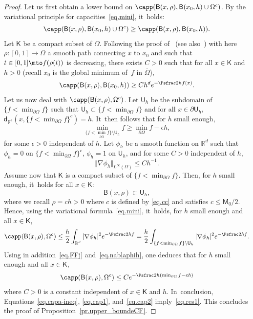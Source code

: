 \begin{proof}
Let us first obtain a lower bound on $\capp(\mathsf B(x,\rho), \mathsf B(x_0,h) \cup \Omega^c)$.
By the variational principle for capacities~\eqref{eq.mini}, it~holds:
\[
\capp(\mathsf B(x,\rho), \mathsf B(x_0,h) \cup \Omega^c)\ge \capp(\mathsf B(x,\rho), \mathsf B(x_0,h)).
\]
Let $\mathsf K$ be a compact subset of $\Omega$.
Following the proof of~\cite[Lem.\,7.10]{landim2017dirichlet} (see also~\cite[Prop.\,4.7]{BEGK}) with here $\rho:[0,1]\to \Omega$ a smooth path connecting $x$ to $x_0$ and such that $t\in [0,1]\mto f(\rho(t))$ is decreasing, there exists $C>0$ such that for all $x\in \mathsf K$ and $h>0$ (recall $x_0$ is the global minimum of~$f$ in $\overline{\Omega}$),
\begin{equation}\label{eq.cap1}
\capp(\mathsf B(x,\rho), \mathsf B(x_0,h))\ge C h^d e^{-\Psfrac 2h f(x)}.
\end{equation}
Let us now deal with $\capp(\mathsf B(x,\rho), \Omega^c) $.
Let
$\mathsf U_h$ be the subdomain of $\{f<\min_{\partial \Omega}f\}$ such that $\overline{\mathsf U_h }\subset \{f<\min_{\partial \Omega}f\} $ and for all $x\in \partial \mathsf U_h$,
$\mathsf d_{\mathbb R^d}(x, {\{f<\min_{\partial \Omega}f\} }^c)=h$. It~then follows that for $h$ small enough,
\begin{equation}\label{eq.FFj}
\min_{\{f<\min_{\partial \Omega}f\} \setminus {\mathsf U_h }} f\ge \min_{\partial \Omega}f -\epsilon h,
\end{equation}
for some $\epsilon >0$ independent of $h$. Let $\phi_h$ be a smooth function on $\mathbb R^d$ such that $\phi_h=0$ on $\{f<\min_{\partial \Omega}f\}^c$, $\phi_h=1$ on $ \mathsf U_h $, and for some $C>0$ independent of $h$,
\begin{equation}\label{eq.nablaphih}
\Vert \nabla \phi_h\Vert _{L^\infty(\Omega)}\le Ch^{-1}.
\end{equation}
Assume now that $\mathsf K$ is a compact subset of $\{f<\min_{\partial \Omega}f\}$. Then, for $h$ small enough, it~holds for all $x\in \mathsf K$:
\[
{\mathsf B(x,\rho)}\subset \mathsf U_h,
\]
where we recall $\rho=ch>0$ where $c$ is defined by \eqref{eq.cc} and satisfies $c\le \mathsf M_0/2$.
Hence, using the variational formula~\eqref{eq.mini}, it~holds, for $h$ small enough and all $x\in \mathsf K$,
\[
\capp(\mathsf B(x,\rho), \Omega^c) \le \frac h2 \int_{\mathbb R^d} \vert\nabla \phi_h \vert^2e^{-\Psfrac 2h f}= \frac h2 \int_{\{f<\min_{\partial \Omega}f\} \setminus {\mathsf U_h }} \vert\nabla \phi_h \vert^2e^{-\Psfrac 2h f}.
\]
Using in addition~\eqref{eq.FFj} and~\eqref{eq.nablaphih}, one deduces that for $h$ small enough and all $x\in \mathsf K$,
\begin{equation}\label{eq.cap2}
\capp(\mathsf B(x,\rho), \Omega^c) \le C e^{-\Psfrac 2h (\min_{\partial \Omega}f -ch)}
\end{equation}
where $C>0$ is a constant independent of $x\in \mathsf K$ and $h$. In~conclusion, Equations~\eqref{eq.capa-ineq}, \eqref{eq.cap1}, and~\eqref{eq.cap2} imply~\eqref{eq.res1}. This concludes the proof of Proposition~\ref{pr.upper_boundeCF}.
\end{proof}

